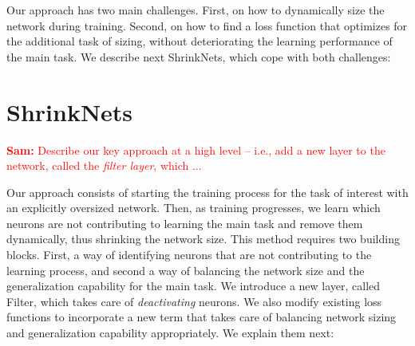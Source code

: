 \documentclass[sigconf]{acmart}
\newcommand{\srm}[1]{\textcolor{red}{{\bf Sam:} #1}}
\begin{document}
Our approach has two main challenges. First, on how to dynamically size the
network during training. Second, on how to find a loss function that optimizes
for the additional task of sizing, without deteriorating the learning
performance of the main task. We describe next ShrinkNets, which cope with both
challenges:

% 
% 

\section{ShrinkNets}

\srm{Describe our key approach at a high level -- i.e., add a new layer to the
network, called the {\it filter layer}, which ... }

Our approach consists of starting the training process for the task of interest
with an explicitly oversized network. Then, as training progresses, we learn
which neurons are not contributing to learning the main task and remove them
dynamically, thus shrinking the network size. This method requires two building
blocks. First, a way of identifying neurons that are not contributing to the
learning process, and second a way of balancing the network size and the
generalization capability for the main task. We introduce a new layer, called
\textsf{Filter}, which takes care of \emph{deactivating} neurons. We also modify
existing loss functions to incorporate a new term that takes care of balancing
network sizing and generalization capability appropriately. We explain them
next:
\end{document}
